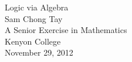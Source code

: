 
\begin{titlepage}
\begin{center}
\phantom{ii}
\vspace{5cm}

 {\huge Logic via Algebra}\\
 \vspace{1.5cm}
 {\Large Sam Chong Tay}\\[15pt]
{A Senior Exercise in Mathematics} \\[5pt]
{Kenyon College}\\[5pt]
{November 29, 2012}\\[2cm]

\end{center}
\end{titlepage}